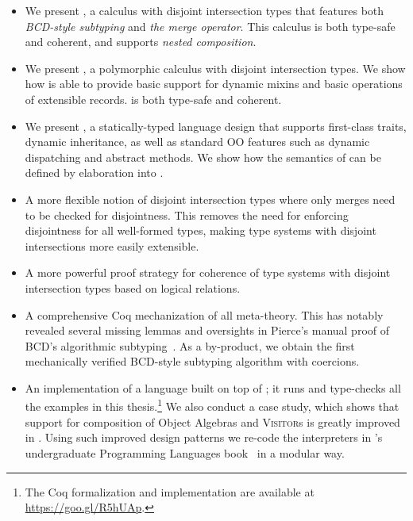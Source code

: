 \begin{itemize}

\item We present \namee, a calculus with disjoint intersection types that
  features both \emph{BCD-style subtyping} and \emph{the merge operator}. This
  calculus is both type-safe and coherent, and supports \emph{nested composition}.

\item We present \fnamee, a polymorphic calculus with disjoint intersection
  types. We show how \fnamee is able to provide basic support for dynamic mixins
  and basic operations of extensible records. \fnamee is both type-safe and
  coherent.

\item We present \sedel, a statically-typed language design that supports
  first-class traits, dynamic inheritance, as well as standard OO features such
  as dynamic dispatching and abstract methods. We show how the semantics of
  \sedel can be defined by elaboration into \fnamee.

\item A more flexible notion of disjoint intersection types where only merges
  need to be checked for disjointness. This removes the need for enforcing
  disjointness for all well-formed types, making type systems with disjoint
  intersections more easily extensible.

\item A more powerful proof strategy for coherence of type systems with disjoint
  intersection types based on logical relations.


\item A comprehensive Coq mechanization of all meta-theory. This has notably
  revealed several missing lemmas and oversights in Pierce's manual
  proof of BCD's algorithmic subtyping~\citep{pierce1989decision}. As a
  by-product, we obtain the first mechanically verified BCD-style subtyping
  algorithm with coercions.

\item An implementation of a language built on top of \sedel; it runs and
  type-checks all the examples in this thesis.\footnote{The Coq formalization
    and implementation are available at \url{https://goo.gl/R5hUAp}.} We also
  conduct a case study, which shows that support for composition of Object
  Algebras and \textsc{Visitor}s is greatly improved in \sedel. Using such
  improved design patterns we re-code the interpreters in
  \citeauthor{poplcook}'s undergraduate Programming Languages
  book~\citep{poplcook} in a modular way.

\end{itemize}


